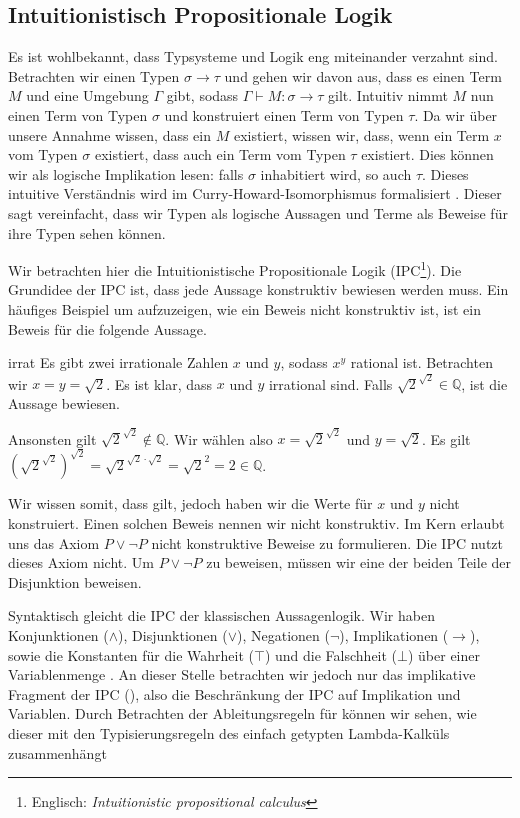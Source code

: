 \subsection{Intuitionistisch Propositionale Logik}
\label{sec:IPC}
Es ist wohlbekannt, dass Typsysteme und Logik eng miteinander verzahnt sind. Betrachten wir einen Typen $\sigma\to\tau$ und gehen wir davon aus, dass es einen Term $M$ und eine Umgebung $\Gamma$ gibt, sodass $\Gamma\vdash M : \sigma\to\tau$ gilt. Intuitiv nimmt $M$ nun einen Term von Typen $\sigma$ und konstruiert einen Term von Typen $\tau$. Da wir über unsere Annahme wissen, dass ein $M$ existiert, wissen wir, dass, wenn ein Term $x$ vom Typen $\sigma$ existiert, dass auch ein Term vom Typen $\tau$ existiert. Dies können wir als logische Implikation lesen: falls $\sigma$ inhabitiert wird, so auch $\tau$. Dieses intuitive Verständnis wird im Curry-Howard-Isomorphismus formalisiert \cite{lecturesCH}. Dieser sagt vereinfacht, dass wir Typen als logische Aussagen und Terme als Beweise für ihre Typen sehen können.

Wir betrachten hier die Intuitionistische Propositionale Logik (IPC\footnote{Englisch: \emph{Intuitionistic propositional calculus}}). Die Grundidee der IPC ist, dass jede Aussage konstruktiv bewiesen werden muss. Ein häufiges Beispiel um aufzuzeigen, wie ein Beweis nicht konstruktiv ist, ist ein Beweis für die folgende Aussage.

\begin{lemma}{}{irrat}
    Es gibt zwei irrationale Zahlen $x$ und $y$, sodass $x^y$ rational ist.
    \Proof
    Betrachten wir $x=y=\sqrt{2}$.  Es ist klar, dass $x$ und $y$ irrational sind. Falls $\sqrt{2}^{\sqrt{2}}\in\mathbb{Q}$, ist die Aussage bewiesen. 
    
    Ansonsten gilt $\sqrt{2}^{\sqrt{2}}\notin\mathbb{Q}$. Wir wählen also $x=\sqrt{2}^{\sqrt{2}}$ und $y=\sqrt{2}$. Es gilt $\left(\sqrt{2}^{\sqrt{2}}\right)^{\sqrt{2}}=\sqrt{2}^{\sqrt{2}\cdot\sqrt{2}}=\sqrt{2}^2=2\in\mathbb{Q}$.
\end{lemma}

Wir wissen somit, dass  gilt, jedoch haben wir die Werte für $x$ und $y$ nicht konstruiert. Einen solchen Beweis nennen wir nicht konstruktiv. Im Kern erlaubt uns das Axiom $P\lor\neg P$ nicht konstruktive Beweise zu formulieren. Die IPC nutzt dieses Axiom nicht. Um $P\lor\neg P$ zu beweisen, müssen wir eine der beiden Teile der Disjunktion beweisen.

Syntaktisch gleicht die IPC der klassischen Aussagenlogik. Wir haben Konjunktionen ($\land$), Disjunktionen ($\lor$), Negationen ($\neg$), Implikationen ($\to$), sowie die Konstanten für die Wahrheit ($\top$) und die Falschheit ($\bot$) über einer Variablenmenge \V. An dieser Stelle betrachten wir jedoch nur das implikative Fragment der IPC (\IPCarr), also die Beschränkung der IPC auf Implikation und Variablen. Durch Betrachten der Ableitungsregeln für \IPCarr{} können wir sehen, wie dieser mit den Typisierungsregeln des einfach getypten Lambda-Kalküls zusammenhängt

